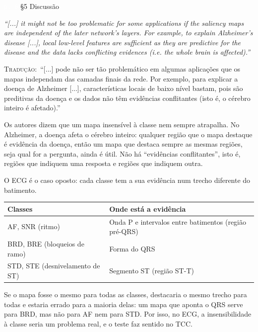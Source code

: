 \documentclass[11pt,a4paper]{article}
\newcommand{\pagechip}[1]{{\setlength{\fboxsep}{1.5pt}\colorbox{cAcc}{\textcolor{white}{\scriptsize\texttt{#1}}}}}
\newenvironment{origquote}{\par\itshape\small}{\par}
\newenvironment{tradquote}{\par\small\textsc{Tradução:}\ }{\par}
\newcommand{\explab}[1]{\par\smallskip{\small\color{cAcc}\textbf{\MakeUppercase{#1}}}\par}
\begin{document}
\begin{citacard}{\pagechip{p. 6} §5 Discussão}
\begin{origquote}“[...] it might not be too problematic for some applications if the saliency maps are independent of the later network's layers. For example, to explain Alzheimer's disease [...], local low-level features are sufficient as they are predictive for the disease and the data lacks conflicting evidences (i.e. the whole brain is affected).”\end{origquote}
\begin{tradquote}“[...] pode não ser tão problemático em algumas aplicações que os mapas independam das camadas finais da rede. Por exemplo, para explicar a doença de Alzheimer [...], características locais de baixo nível bastam, pois são preditivas da doença e os dados não têm evidências conflitantes (isto é, o cérebro inteiro é afetado).”\end{tradquote}
\explab{Explicação}
Os autores dizem que um mapa insensível à classe nem sempre atrapalha. No Alzheimer, a doença afeta o cérebro inteiro: qualquer região que o mapa destaque é evidência da doença, então um mapa que destaca sempre as mesmas regiões, seja qual for a pergunta, ainda é útil. Não há “evidências conflitantes”, isto é, regiões que indiquem uma resposta e regiões que indiquem outra.

O ECG é o caso oposto: cada classe tem a sua evidência num trecho diferente do batimento.
\begin{center}\small
\begin{tabular}{ll}
\toprule
\textbf{Classes} & \textbf{Onde está a evidência} \\
\midrule
AF, SNR (ritmo) & Onda P e intervalos entre batimentos (região pré-QRS) \\
BRD, BRE (bloqueios de ramo) & Forma do QRS \\
STD, STE (desnivelamento de ST) & Segmento ST (região ST-T) \\
\bottomrule
\end{tabular}
\end{center}
Se o mapa fosse o mesmo para todas as classes, destacaria o mesmo trecho para todas e estaria errado para a maioria delas: um mapa que aponta o QRS serve para BRD, mas não para AF nem para STD. Por isso, no ECG, a insensibilidade à classe seria um problema real, e o teste faz sentido no TCC.
\end{citacard}
\end{document}
